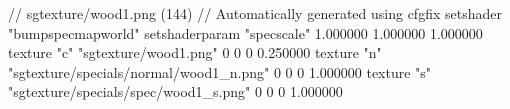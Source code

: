// sgtexture/wood1.png (144)
// Automatically generated using cfgfix
setshader "bumpspecmapworld"
setshaderparam "specscale" 1.000000 1.000000 1.000000
texture "c" "sgtexture/wood1.png" 0 0 0 0.250000
texture "n" "sgtexture/specials/normal/wood1_n.png" 0 0 0 1.000000
texture "s" "sgtexture/specials/spec/wood1_s.png" 0 0 0 1.000000
